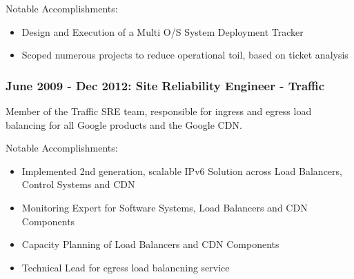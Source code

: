 \documentclass[a4paper, 11pt] {article}
\begin{document}
Notable Accomplishments:

\begin{itemize}
  \item Design and Execution of a Multi O/S System Deployment Tracker
  \item Scoped numerous projects to reduce operational toil, based on ticket analysis
\end{itemize}

\subsubsection*{June 2009 - Dec 2012: Site Reliability Engineer - Traffic}

Member of the Traffic SRE team, responsible for ingress and egress load balancing for all Google products and the Google CDN.

Notable Accomplishments:

\begin{itemize}
  \item Implemented 2nd generation, scalable IPv6 Solution across Load Balancers, Control Systems and CDN
  \item Monitoring Expert for Software Systems, Load Balancers and CDN Components 
  \item Capacity Planning of Load Balancers and CDN Components
  \item Technical Lead for egress load balancning service
\end{itemize}
\end{document}
